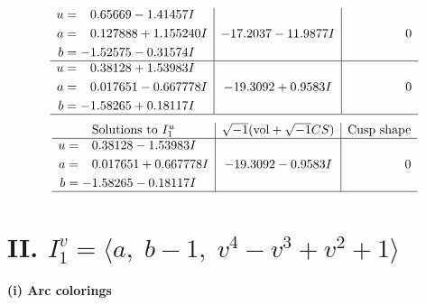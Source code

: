 \documentclass[1p]{elsarticle_modified}
\theoremstyle{definition}
\newcommand{\I}{\sqrt{-1}}
\begin{document}
$$\begin{array}{c|c|c}
\begin{aligned}
u &= \phantom{-}0.65669 - 1.41457 I \\
a &= \phantom{-}0.127888 + 1.155240 I \\
b &= -1.52575 - 0.31574 I\end{aligned}
 & -17.2037 - 11.9877 I & \phantom{-0.000000 } 0 \\ \hline\begin{aligned}
u &= \phantom{-}0.38128 + 1.53983 I \\
a &= \phantom{-}0.017651 - 0.667778 I \\
b &= -1.58265 + 0.18117 I\end{aligned}
 & -19.3092 + 0.9583 I & \phantom{-0.000000 } 0\\
 \hline 
 \end{array}$$\newpage$$\begin{array}{c|c|c}  
\text{Solutions to }I^u_{1}& \I (\text{vol} + \sqrt{-1}CS) & \text{Cusp shape}\\
 \hline 
\begin{aligned}
u &= \phantom{-}0.38128 - 1.53983 I \\
a &= \phantom{-}0.017651 + 0.667778 I \\
b &= -1.58265 - 0.18117 I\end{aligned}
 & -19.3092 - 0.9583 I & \phantom{-0.000000 } 0\\
 \hline 
 \end{array}$$\newpage\newpage\renewcommand{\arraystretch}{1}
\centering \section*{II. $I^v_{1}= \langle a,\;b-1,\;v^4- v^3+v^2+1 \rangle$}
\flushleft \textbf{(i) Arc colorings}\\
\end{document}
